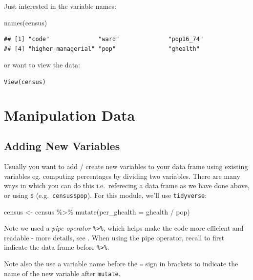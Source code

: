 \documentclass[
]{book}
\newenvironment{Shaded}{\begin{snugshade}}{\end{snugshade}}
\newcommand{\AttributeTok}[1]{\textcolor[rgb]{0.77,0.63,0.00}{#1}}
\newcommand{\FunctionTok}[1]{\textcolor[rgb]{0.00,0.00,0.00}{#1}}
\newcommand{\NormalTok}[1]{#1}
\newcommand{\OtherTok}[1]{\textcolor[rgb]{0.56,0.35,0.01}{#1}}
\newcommand{\SpecialCharTok}[1]{\textcolor[rgb]{0.00,0.00,0.00}{#1}}
\begin{document}
Just interested in the variable names:

\begin{Shaded}
\begin{Highlighting}[]
\FunctionTok{names}\NormalTok{(census)}
\end{Highlighting}
\end{Shaded}

\begin{verbatim}
## [1] "code"              "ward"              "pop16_74"         
## [4] "higher_managerial" "pop"               "ghealth"
\end{verbatim}

or want to view the data:

\texttt{View(census)}

\hypertarget{manipulation-data}{%
\section{Manipulation Data}\label{manipulation-data}}

\hypertarget{adding-new-variables}{%
\subsection{Adding New Variables}\label{adding-new-variables}}

Usually you want to add / create new variables to your data frame using existing variables eg. computing percentages by dividing two variables. There are many ways in which you can do this i.e.~referecing a data frame as we have done above, or using \texttt{\$} (e.g.~\texttt{census\$pop}). For this module, we'll use \texttt{tidyverse}:

\begin{Shaded}
\begin{Highlighting}[]
\NormalTok{census }\OtherTok{\textless{}{-}}\NormalTok{ census }\SpecialCharTok{\%\textgreater{}\%} \FunctionTok{mutate}\NormalTok{(}\AttributeTok{per\_ghealth =}\NormalTok{ ghealth }\SpecialCharTok{/}\NormalTok{ pop)}
\end{Highlighting}
\end{Shaded}

Note we used a \emph{pipe operator} \texttt{\%\textgreater{}\%}, which helps make the code more efficient and readable - more details, see \citet{grolemund_wickham_2019_book}. When using the pipe operator, recall to first indicate the data frame before \texttt{\%\textgreater{}\%}.

Note also the use a variable name before the \texttt{=} sign in brackets to indicate the name of the new variable after \texttt{mutate}.
\end{document}
